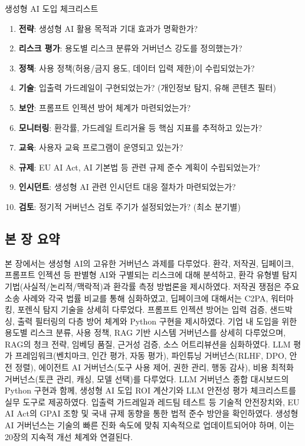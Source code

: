 \begin{practicaltool}{생성형 AI 도입 체크리스트}
\begin{enumerate}
 \item \textbf{전략}: 생성형 AI 활용 목적과 기대 효과가 명확한가?
 \item \textbf{리스크 평가}: 용도별 리스크 분류와 거버넌스 강도를 정의했는가?
 \item \textbf{정책}: 사용 정책(허용/금지 용도, 데이터 입력 제한)이 수립되었는가?
 \item \textbf{기술}: 입출력 가드레일이 구현되었는가? (개인정보 탐지, 유해 콘텐츠 필터)
 \item \textbf{보안}: 프롬프트 인젝션 방어 체계가 마련되었는가?
 \item \textbf{모니터링}: 환각률, 가드레일 트리거율 등 핵심 지표를 추적하고 있는가?
 \item \textbf{교육}: 사용자 교육 프로그램이 운영되고 있는가?
 \item \textbf{규제}: EU AI Act, AI 기본법 등 관련 규제 준수 계획이 수립되었는가?
 \item \textbf{인시던트}: 생성형 AI 관련 인시던트 대응 절차가 마련되었는가?
 \item \textbf{검토}: 정기적 거버넌스 검토 주기가 설정되었는가? (최소 분기별)
\end{enumerate}
\end{practicaltool}

\subsection*{본 장 요약}

본 장에서는 생성형 AI의 고유한 거버넌스 과제를 다루었다. 환각, 저작권, 딥페이크, 프롬프트 인젝션 등 판별형 AI와 구별되는 리스크에 대해 분석하고, 환각 유형별 탐지 기법(사실적/논리적/맥락적)과 환각률 측정 방법론을 제시하였다. 저작권 쟁점은 주요 소송 사례와 각국 법률 비교를 통해 심화하였고, 딥페이크에 대해서는 C2PA, 워터마킹, 포렌식 탐지 기술을 상세히 다루었다. 프롬프트 인젝션 방어는 입력 검증, 샌드박싱, 출력 필터링의 다층 방어 체계와 Python 구현을 제시하였다. 기업 내 도입을 위한 용도별 리스크 분류, 사용 정책, RAG 기반 시스템 거버넌스를 상세히 다루었으며, RAG의 청크 전략, 임베딩 품질, 근거성 검증, 소스 어트리뷰션을 심화하였다. LLM 평가 프레임워크(벤치마크, 인간 평가, 자동 평가), 파인튜닝 거버넌스(RLHF, DPO, 안전 정렬), 에이전트 AI 거버넌스(도구 사용 제어, 권한 관리, 행동 감사), 비용 최적화 거버넌스(토큰 관리, 캐싱, 모델 선택)를 다루었다. LLM 거버넌스 종합 대시보드의 Python 구현과 함께, 생성형 AI 도입 ROI 계산기와 LLM 안전성 평가 체크리스트를 실무 도구로 제공하였다. 입출력 가드레일과 레드팀 테스트 등 기술적 안전장치와, EU AI Act의 GPAI 조항 및 국내 규제 동향을 통한 법적 준수 방안을 확인하였다. 생성형 AI 거버넌스는 기술의 빠른 진화 속도에 맞춰 지속적으로 업데이트되어야 하며, 이는 20장의 지속적 개선 체계와 연결된다.
